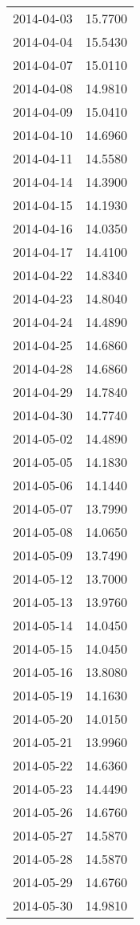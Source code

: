 \begin{tabular}{lr}
2014-04-03 &     15.7700 \\
2014-04-04 &     15.5430 \\
2014-04-07 &     15.0110 \\
2014-04-08 &     14.9810 \\
2014-04-09 &     15.0410 \\
2014-04-10 &     14.6960 \\
2014-04-11 &     14.5580 \\
2014-04-14 &     14.3900 \\
2014-04-15 &     14.1930 \\
2014-04-16 &     14.0350 \\
2014-04-17 &     14.4100 \\
2014-04-22 &     14.8340 \\
2014-04-23 &     14.8040 \\
2014-04-24 &     14.4890 \\
2014-04-25 &     14.6860 \\
2014-04-28 &     14.6860 \\
2014-04-29 &     14.7840 \\
2014-04-30 &     14.7740 \\
2014-05-02 &     14.4890 \\
2014-05-05 &     14.1830 \\
2014-05-06 &     14.1440 \\
2014-05-07 &     13.7990 \\
2014-05-08 &     14.0650 \\
2014-05-09 &     13.7490 \\
2014-05-12 &     13.7000 \\
2014-05-13 &     13.9760 \\
2014-05-14 &     14.0450 \\
2014-05-15 &     14.0450 \\
2014-05-16 &     13.8080 \\
2014-05-19 &     14.1630 \\
2014-05-20 &     14.0150 \\
2014-05-21 &     13.9960 \\
2014-05-22 &     14.6360 \\
2014-05-23 &     14.4490 \\
2014-05-26 &     14.6760 \\
2014-05-27 &     14.5870 \\
2014-05-28 &     14.5870 \\
2014-05-29 &     14.6760 \\
2014-05-30 &     14.9810 \\

\end{tabular}
